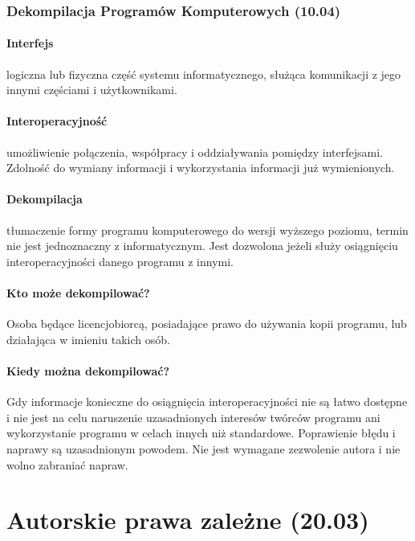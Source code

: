 \documentclass{article}
\begin{document}
\subsubsection{Dekompilacja Programów Komputerowych (10.04)}

\paragraph{Interfejs}

logiczna lub fizyczna część systemu informatycznego, służąca komunikacji z jego innymi częściami i użytkownikami.

\paragraph{Interoperacyjność}

umożliwienie połączenia, współpracy i oddziaływania pomiędzy interfejsami.
Zdolność do wymiany informacji i wykorzystania informacji już wymienionych.

\paragraph{Dekompilacja}

tłumaczenie formy programu komputerowego do wersji wyższego poziomu, termin nie jest jednoznaczny z informatycznym. Jest dozwolona jeżeli służy osiągnięciu interoperacyjności danego programu z innymi.

\paragraph{Kto może dekompilować?}

Osoba będące licencjobiorcą, posiadające prawo do używania kopii programu, lub działająca w imieniu takich osób.

\paragraph{Kiedy można dekompilować?}

Gdy informacje konieczne do osiągnięcia interoperacyjności nie są łatwo dostępne i nie jest na celu naruszenie uzasadnionych interesów twórców programu ani wykorzystanie programu w celach innych niż standardowe.
Poprawienie błędu i naprawy są uzasadnionym powodem.
Nie jest wymagane zezwolenie autora i nie wolno zabraniać napraw.


\section{Autorskie prawa zależne (20.03)}
\end{document}
